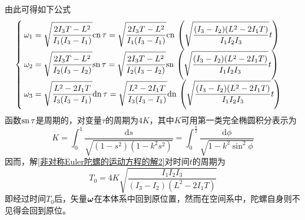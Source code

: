 由此可得如下公式
\begin{equation}
\begin{cases}
	\displaystyle \omega_1 = \sqrt{\frac{2I_3T-L^2}{I_1(I_3-I_1)}}\mathrm{cn}\, \tau = \sqrt{\frac{2I_3T-L^2}{I_1(I_3-I_1)}}\mathrm{cn}\, \left(\sqrt{\frac{(I_3-I_2)(L^2-2I_1T)}{I_1I_2I_3}}t\right) \\
	\displaystyle \omega_2 = \sqrt{\frac{2I_3T-L^2}{I_2(I_3-I_2)}}\mathrm{sn}\, \tau = \sqrt{\frac{2I_3T-L^2}{I_2(I_3-I_2)}}\mathrm{sn}\, \left(\sqrt{\frac{(I_3-I_2)(L^2-2I_1T)}{I_1I_2I_3}}t\right) \\
	\displaystyle \omega_3 = \sqrt{\frac{L^2-2I_1T}{I_3(I_3-I_1)}}\mathrm{dn}\, \tau = \sqrt{\frac{L^2-2I_1T}{I_3(I_3-I_1)}}\mathrm{dn}\, \left(\sqrt{\frac{(I_3-I_2)(L^2-2I_1T)}{I_1I_2I_3}}t\right)
\end{cases}
\label{非对称Euler陀螺的运动方程的解2}
\end{equation}
函数$\mathrm{sn}\, \tau$是周期的，对变量$\tau$的周期为$4K$，其中$K$可用第一类完全椭圆积分表示为
\begin{equation*}
	K = \int_0^1 \frac{\mathrm{d}s}{\sqrt{(1-s^2)(1-k^2s^2)}} = \int_0^{\frac{\pi}{2}} \frac{\mathrm{d}\phi}{\sqrt{1-k^2\sin^2\phi}}
\end{equation*}
因而，解\eqref{非对称Euler陀螺的运动方程的解2}对时间$t$的周期为
\begin{equation}
	T_0 = 4K\sqrt{\frac{I_1I_2I_3}{(I_3-I_2)(L^2-2I_1T)}}
\end{equation}
即经过时间$T_0$后，矢量$\boldsymbol{\omega}$在本体系中回到原位置，然而在空间系中，陀螺自身则不见得会回到原位。


